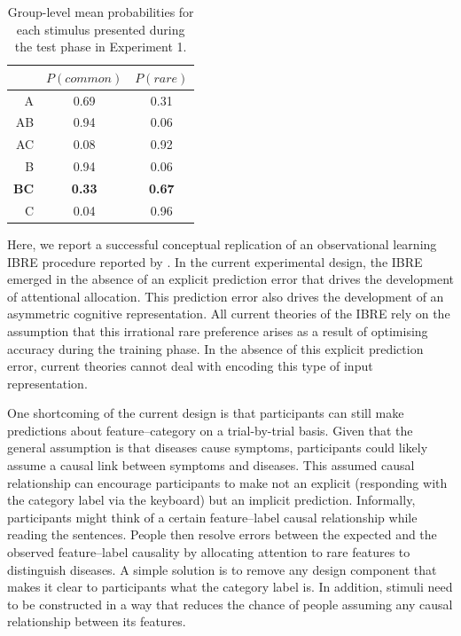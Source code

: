 \documentclass[10pt,letterpaper]{article}
\begin{document}
\begin{table}[ht]
  \begin{center}
    \caption{Group-level mean probabilities for each stimulus presented during the test phase in Experiment 1. \\}
    \label{tab:results-exp1}
    \vskip 0.12in
    \begin{tabular}{rcc}
      \hline
      & $P(common)$ & $P(rare)$ \\
      \hline
      A & 0.69 & 0.31 \\
      AB & 0.94 & 0.06 \\
      AC & 0.08 & 0.92 \\
      B & 0.94 & 0.06 \\
      \textbf{BC} & \textbf{0.33} & \textbf{0.67} \\
      C & 0.04 & 0.96 \\
    \end{tabular}
  \end{center}
\end{table}

Here, we report a successful conceptual replication of an observational learning IBRE procedure reported by \cite{johansen2007paradoxical}.
In the current experimental design, the IBRE emerged in the absence of an explicit prediction error that drives the development of attentional allocation.
This prediction error also drives the development of an asymmetric cognitive representation.
All current theories of the IBRE rely on the assumption that this irrational rare preference arises as a result of optimising accuracy during the training phase.
In the absence of this explicit prediction error, current theories cannot deal with encoding this type of input representation.

One shortcoming of the current design is that participants can still make predictions about feature--category on a trial-by-trial basis.
Given that the general assumption is that diseases cause symptoms, participants could likely assume a causal link between symptoms and diseases.
This assumed causal relationship can encourage participants to make not an explicit (responding with the category label via the keyboard) but an implicit prediction.
Informally, participants might think of a certain feature--label causal relationship while reading the sentences.
People then resolve errors between the expected and the observed feature--label causality by allocating attention to rare features to distinguish diseases.
A simple solution is to remove any design component that makes it clear to participants what the category label is.
In addition, stimuli need to be constructed in a way that reduces the chance of people assuming any causal relationship between its features.
\end{document}
